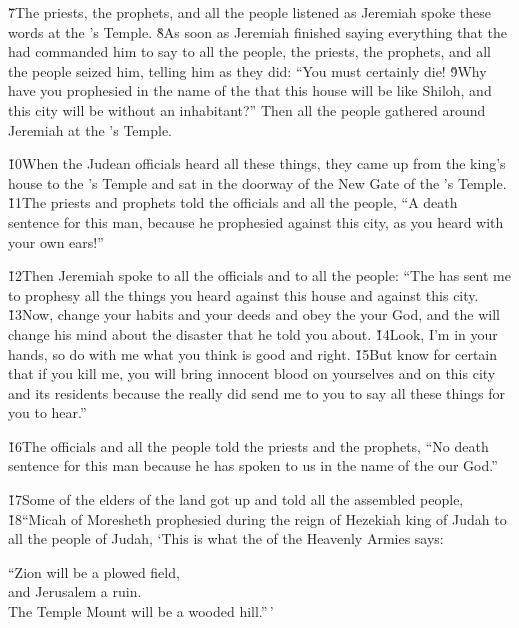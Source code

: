 \v{7}The priests, the prophets, and all the people listened as Jeremiah spoke these words at the 's Temple. \v{8}As soon as Jeremiah finished saying everything that the  had commanded him to say to all the people, the priests, the prophets, and all the people seized him, telling him as they did: ``You must certainly die! \v{9}Why have you prophesied in the name of the  that this house will be like Shiloh, and this city will be without an inhabitant?'' Then all the people gathered around Jeremiah at the 's Temple.

\v{10}When the Judean officials heard all these things, they came up from the king's house to the 's Temple and sat in the doorway of the New Gate of the 's Temple. \v{11}The priests and prophets told the officials and all the people, ``A death sentence for this man, because he prophesied against this city, as you heard with your own ears!''

\v{12}Then Jeremiah spoke to all the officials and to all the people: ``The  has sent me to prophesy all the things you heard against this house and against this city. \v{13}Now, change your habits and your deeds and obey the  your God, and the  will change his mind about the disaster that he told you about. \v{14}Look, I'm in your hands, so do with me what you think is good and right. \v{15}But know for certain that if you kill me, you will bring innocent blood on yourselves and on this city and its residents because the  really did send me to you to say all these things for you to hear.''

\v{16}The officials and all the people told the priests and the prophets, ``No death sentence for this man because he has spoken to us in the name of the  our God.''

\v{17}Some of the elders of the land got up and told all the assembled people, \v{18}``Micah of Moresheth prophesied during the reign of Hezekiah king of Judah to all the people of Judah, `This is what the  of the Heavenly Armies says:

\begin{poetry}
\poeml ``Zion will be a plowed field, \\
\poemll    and Jerusalem a ruin. \\
\poemlll       The Temple Mount will be a wooded hill.''\,'
\end{poetry}

